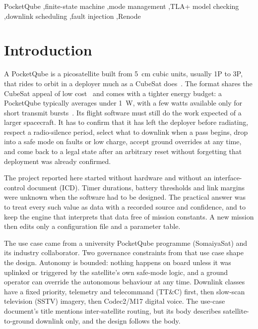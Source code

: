 \documentclass[preprint,12pt]{elsarticle}
\newcommand{\ttc}{TT\&C}
\begin{document}
\begin{frontmatter}
\begin{keyword}
PocketQube \sep finite-state machine \sep mode management \sep TLA+ model checking \sep downlink scheduling \sep fault injection \sep Renode
\end{keyword}

\end{frontmatter}

\section{Introduction}\label{sec:intro}

A PocketQube is a picosatellite built from 5~cm cubic units, usually 1P to 3P, that rides to orbit in a deployer much as a CubeSat does~\cite{Franzese2025Survey,PuigSuari2001CubeSat}. The format shares the CubeSat appeal of low cost~\cite{PuigSuari2001CubeSat} and comes with a tighter energy budget: a PocketQube typically averages under 1~W, with a few watts available only for short transmit bursts~\cite{Franzese2025Survey}. Its flight software must still do the work expected of a larger spacecraft. It has to confirm that it has left the deployer before radiating, respect a radio-silence period, select what to downlink when a pass begins, drop into a safe mode on faults or low charge, accept ground overrides at any time, and come back to a legal state after an arbitrary reset without forgetting that deployment was already confirmed.

The project reported here started without hardware and without an interface-control document (ICD). Timer durations, battery thresholds and link margins were unknown when the software had to be designed. The practical answer was to treat every such value as data with a recorded source and confidence, and to keep the engine that interprets that data free of mission constants. A new mission then edits only a configuration file and a parameter table.

The use case came from a university PocketQube programme (SomaiyaSat) and its industry collaborator. Two governance constraints from that use case shape the design. Autonomy is bounded: nothing happens on board unless it was uplinked or triggered by the satellite's own safe-mode logic, and a ground operator can override the autonomous behaviour at any time. Downlink classes have a fixed priority, telemetry and telecommand (\ttc{}) first, then slow-scan television (SSTV) imagery, then Codec2/M17 digital voice. The use-case document's title mentions inter-satellite routing, but its body describes satellite-to-ground downlink only, and the design follows the body.
\end{document}
